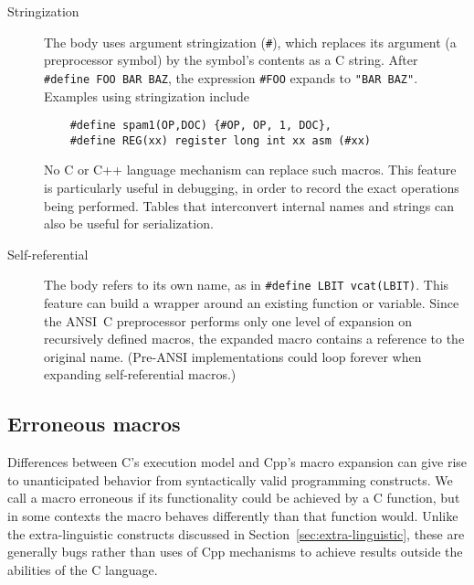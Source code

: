\documentclass[10pt]{article}
\begin{document}
\begin{description}

\item[Stringization]
  The body uses argument stringization ({\tt \#}), which replaces its
  argument (a preprocessor symbol) by the symbol's contents as a C string.
  After {\tt \#define FOO BAR BAZ}, the expression {\tt \#FOO} expands to
  {\tt "BAR~BAZ"}.  Examples using stringization include
\begin{verbatim}
    #define spam1(OP,DOC) {#OP, OP, 1, DOC},
    #define REG(xx) register long int xx asm (#xx)
\end{verbatim}
  No C or C++ language mechanism can replace such macros.  This feature is
  particularly useful in debugging, in order to record the exact
  operations being performed.  Tables that interconvert internal names and
  strings can also be useful for serialization.

\item[Self-referential]
  The body refers to its own name, as in {\tt \#define LBIT vcat(LBIT)}.
  This feature can build a wrapper around an existing function or variable.
  Since the ANSI~C preprocessor performs only one level of expansion on
  recursively defined macros, the expanded macro contains a reference to
  the original name.  (Pre-ANSI implementations could loop forever when
  expanding self-referential macros.)

\end{description}



\subsection{Erroneous macros}
\label{sec:lint}

Differences between C's execution model and Cpp's macro expansion can give
rise to unanticipated behavior from syntactically valid programming
constructs.  We call a macro erroneous if its functionality could be
achieved by a C function, but in some contexts the macro behaves
differently than that function would.  Unlike the extra-linguistic
constructs discussed in Section~\ref{sec:extra-linguistic}, these are
generally bugs rather than uses of Cpp mechanisms to achieve results
outside the abilities of the C language.
\end{document}
